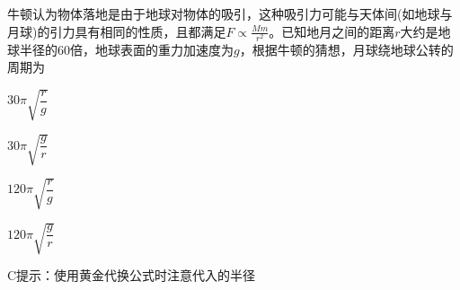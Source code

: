 牛顿认为物体落地是由于地球对物体的吸引，这种吸引力可能与天体间(如地球与月球)的引力具有相同的性质，且都满足\(F\propto \frac{Mm}{r^2}\)。已知地月之间的距离\(r\)大约是地球半径的60倍，地球表面的重力加速度为\(g\)，根据牛顿的猜想，月球绕地球公转的周期为\paren[]
\begin{choices}
	\item \(30\pi \sqrt{\dfrac{r}{g}}\)
	\item \(30\pi \sqrt{\dfrac{g}{r}}\)
	\item \(120\pi \sqrt{\dfrac{r}{g}}\)
	\item \(120\pi \sqrt{\dfrac{g}{r}}\)
\end{choices}
\begin{answer}
	C\qquad 提示：使用黄金代换公式时注意代入的半径
\end{answer}